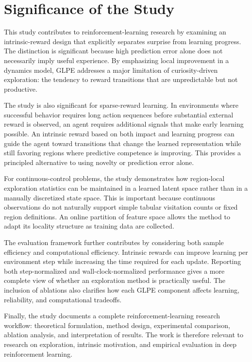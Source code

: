 \section{Significance of the Study}
\label{sec:significance_of_the_study}

This study contributes to reinforcement-learning research by examining an intrinsic-reward design that explicitly separates surprise from learning progress.
The distinction is significant because high prediction error alone does not necessarily imply useful experience.
By emphasizing local improvement in a dynamics model, GLPE addresses a major limitation of curiosity-driven exploration: the tendency to reward transitions that are unpredictable but not productive.

The study is also significant for sparse-reward learning.
In environments where successful behavior requires long action sequences before substantial external reward is observed, an agent requires additional signals that make early learning possible.
An intrinsic reward based on both impact and learning progress can guide the agent toward transitions that change the learned representation while still favoring regions where predictive competence is improving.
This provides a principled alternative to using novelty or prediction error alone.

For continuous-control problems, the study demonstrates how region-local exploration statistics can be maintained in a learned latent space rather than in a manually discretized state space.
This is important because continuous observations do not naturally support simple tabular visitation counts or fixed region definitions.
An online partition of feature space allows the method to adapt its locality structure as training data are collected.

The evaluation framework further contributes by considering both sample efficiency and computational efficiency.
Intrinsic rewards can improve learning per environment step while increasing the time required for each update.
Reporting both step-normalized and wall-clock-normalized performance gives a more complete view of whether an exploration method is practically useful.
The inclusion of ablations also clarifies how each GLPE component affects learning, reliability, and computational tradeoffs.

Finally, the study documents a complete reinforcement-learning research workflow: theoretical formulation, method design, experimental comparison, ablation analysis, and interpretation of results.
The work is therefore relevant to research on exploration, intrinsic motivation, and empirical evaluation in deep reinforcement learning.